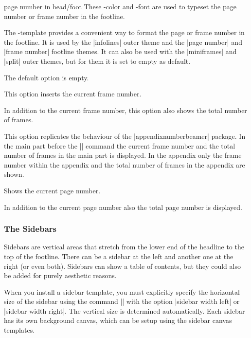 \begin{element}{page number in head/foot}\yes\yes\yes
  These \beamer-color and -font are used to typeset the page number or frame number in the footline.
  
  The \beamer-template provides a convenient way to format the page or frame number in the footline. It is used by the |infolines| outer theme and the |page number| and |frame number| footline themes. It can also be used with the |miniframes| and |split| outer themes, but for them it is set to empty as default.
  
  \begin{templateoptions}
     The default option is empty.
    
     This option inserts the current frame number.
    
     In addition to the current frame number, this option also shows the total number of frames. 
    
     This option replicates the behaviour of the |appendixnumberbeamer| package. In the main part before the |\appendix| command the current frame number and the total number of frames in the main part is displayed. In the appendix only the frame number within the appendix and the total number of frames in the appendix are shown.

     Shows the current page number.
    
     In addition to the current page number also the total page number is displayed.
  \end{templateoptions}
   
\end{element}

\subsubsection{The Sidebars}

Sidebars are vertical areas that stretch from the lower end of the headline to the top of the footline. There can be a sidebar at the left and another one at the right (or even both). Sidebars can show a table of contents, but they could also be added for purely aesthetic reasons.

When you install a sidebar template, you must explicitly specify the horizontal size of the sidebar using the command |\setbeamersize| with the option |sidebar width left| or |sidebar width right|. The vertical size is determined automatically. Each sidebar has its own background canvas, which can be setup using the sidebar canvas templates.

